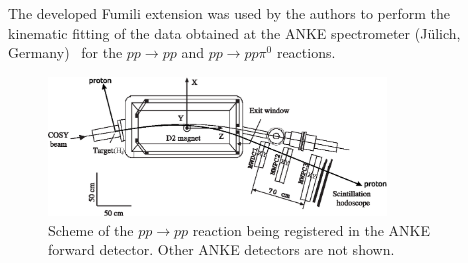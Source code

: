 The developed Fumili extension was used by the authors to perform the kinematic fitting of the data obtained at the ANKE spectrometer (Jülich, Germany)~\cite{anke} for the $pp \to pp$ and $pp \to pp\pi^0$ reactions.


\begin{figure}[htbp]\centering
\includegraphics[width=0.8\textwidth]{pics/setup_bw.eps}
\caption{
Scheme of the $pp \to pp$ reaction being registered in the ANKE forward detector. Other ANKE detectors are not shown.
}
\label{anke_scheme}
\end{figure}

